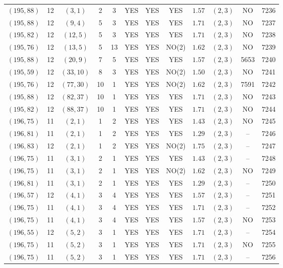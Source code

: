 \begin{longtable}{|c|c|c|c|c|c|c|c|c|c|c|c|}
$(195,88)$ & 12 & $(3,1)$ & 2 & 3 & YES & YES & YES & $1.57$ & $(2,3)$ & NO & 7236\\
$(195,88)$ & 12 & $(9,4)$ & 5 & 3 & YES & YES & YES & $1.71$ & $(2,3)$ & NO & 7237\\
$(195,82)$ & 12 & $(12,5)$ & 5 & 3 & YES & YES & YES & $1.71$ & $(2,3)$ & NO & 7238\\
$(195,76)$ & 12 & $(13,5)$ & 5 & 13 & YES & YES & NO(2) & $1.62$ & $(2,3)$ & NO & 7239\\
$(195,88)$ & 12 & $(20,9)$ & 7 & 5 & YES & YES & YES & $1.57$ & $(2,3)$ & 5653 & 7240\\
$(195,59)$ & 12 & $(33,10)$ & 8 & 3 & YES & YES & NO(2) & $1.50$ & $(2,3)$ & NO & 7241\\
$(195,76)$ & 12 & $(77,30)$ & 10 & 1 & YES & YES & NO(2) & $1.62$ & $(2,3)$ & 7591 & 7242\\
$(195,88)$ & 12 & $(82,37)$ & 10 & 1 & YES & YES & YES & $1.71$ & $(2,3)$ & NO & 7243\\
$(195,82)$ & 12 & $(88,37)$ & 10 & 1 & YES & YES & YES & $1.71$ & $(2,3)$ & NO & 7244\\
$(196,75)$ & 11 & $(2,1)$ & 1 & 2 & YES & YES & YES & $1.43$ & $(2,3)$ & NO & 7245\\
$(196,81)$ & 11 & $(2,1)$ & 1 & 2 & YES & YES & YES & $1.29$ & $(2,3)$ & -- & 7246\\
$(196,83)$ & 12 & $(2,1)$ & 1 & 2 & YES & YES & NO(2) & $1.75$ & $(2,3)$ & -- & 7247\\
$(196,75)$ & 11 & $(3,1)$ & 2 & 1 & YES & YES & YES & $1.43$ & $(2,3)$ & -- & 7248\\
$(196,75)$ & 11 & $(3,1)$ & 2 & 1 & YES & YES & NO(2) & $1.62$ & $(2,3)$ & NO & 7249\\
$(196,81)$ & 11 & $(3,1)$ & 2 & 1 & YES & YES & YES & $1.29$ & $(2,3)$ & -- & 7250\\
$(196,57)$ & 12 & $(4,1)$ & 3 & 4 & YES & YES & YES & $1.57$ & $(2,3)$ & -- & 7251\\
$(196,75)$ & 11 & $(4,1)$ & 3 & 4 & YES & YES & YES & $1.71$ & $(2,3)$ & -- & 7252\\
$(196,75)$ & 11 & $(4,1)$ & 3 & 4 & YES & YES & YES & $1.57$ & $(2,3)$ & NO & 7253\\
$(196,55)$ & 12 & $(5,2)$ & 3 & 1 & YES & YES & YES & $1.71$ & $(2,3)$ & -- & 7254\\
$(196,75)$ & 11 & $(5,2)$ & 3 & 1 & YES & YES & YES & $1.71$ & $(2,3)$ & NO & 7255\\
$(196,75)$ & 11 & $(5,2)$ & 3 & 1 & YES & YES & YES & $1.71$ & $(2,3)$ & -- & 7256\\

\end{longtable}
